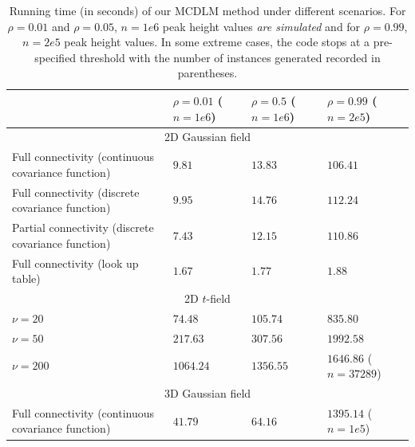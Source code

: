 \documentclass{article}
\newcommand{\nt}[1]{\textit{\color{red} #1}}
\begin{document}
\begin{table}[!htp]
\small
\begin{center}
\caption{Running time (in seconds) of our MCDLM method under different scenarios. For $\rho = 0.01$ and $\rho = 0.05$,  $n = 1e6$ peak height values \nt{are simulated} and for $\rho = 0.99$, $n = 2e5$ peak height values. In some extreme cases, the code stops at a pre-specified threshold with the number of instances generated recorded in parentheses.\label{tab1}}
\begin{tabular}{|l|l|l|l|}
\hline & $\rho = 0.01$ ($n = 1e6$) & $\rho = 0.5$ ($n = 1e6$) & $\rho = 0.99$ ($n = 2e5$) \\ \hline
\multicolumn{4}{|c|}{2D Gaussian field}                                                                                          \\ \hline
Full connectivity (continuous covariance function)  & $9.81$                    & $13.83$                  & $106.41$                  \\ \hline
Full connectivity (discrete covariance function)    & $9.95$                    & $14.76$                  & $112.24$                  \\ \hline
Partial connectivity (discrete covariance function) & $7.43$                    & $12.15$                  & $110.86$                  \\ \hline
Full connectivity (look up table)                   & $1.67$                    & $1.77$                   & $1.88$                    \\ \hline
\multicolumn{4}{|c|}{2D $t$-field}                                                                                                 \\ \hline
$\nu = 20$                                          & $74.48$                   & $105.74$                 & $835.80$                  \\ \hline
$\nu = 50$                                          & $217.63$                  & $307.56$                 & $1992.58$                 \\ \hline
$\nu = 200$                                         & $1064.24$                 & $1356.55$                & $1646.86$ ($n = 37289$)     \\ \hline
\multicolumn{4}{|c|}{3D Gaussian field}                                                                                          \\ \hline
Full connectivity (continuous covariance function)  & $41.79$                   & $64.16$                  & $1395.14$ ($n = 1e5$)       \\ \hline

\end{tabular}
\end{center}
\end{table}
\end{document}

